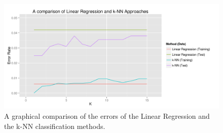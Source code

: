 \documentclass{article}
\begin{document}
  \begin{figure}[h]
    \centering
    \includegraphics[width=.9\linewidth]{error_plot}
    \caption{A graphical comparison of the errors of the Linear Regression and the k-NN classification methods.}
    \label{fig:errors}
  \end{figure}
\end{document}
